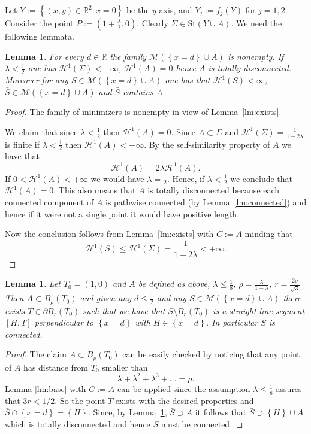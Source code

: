 \documentclass{amsart}
\newcommand{\RR}{\mathbb R}
\renewcommand{\H}{\mathcal H}
\newcommand{\ENCLOSE}[1]{\left\{#1\right\}}
\newcommand{\St}{\mathrm{St}}
\newcommand{\M}{\mathcal{M}}
\renewcommand{\H}{\mathcal{H}}
\newtheorem{lemma}[theorem]{Lemma}
\theoremstyle{definition}
\theoremstyle{remark}
\begin{document}
Let $Y:=\ENCLOSE{(x,y)\in\RR^2\colon x=0}$ be the $y$-axis,
and $Y_j := f_j(Y)$ for $j=1,2$.
Consider the point $P:=(1+\frac\lambda 2,0)$.
Clearly $\Sigma\in \St(Y\cup A)$.
We need the following lemmata.

\begin{lemma}\label{lm:existsA} 
  For every $d\in \RR$ the family $\M(\ENCLOSE{x=d}\cup A)$ is nonempty.
  If $\lambda < \frac 1 2$
  one has $\H^1(\Sigma)<+\infty$, $\H^1(A)=0$ hence $A$ is totally disconnected.
  Moreover for any $S \in \M(\ENCLOSE{x=d}\cup A)$ 
  one has that $\H^1(S)<\infty$,
  $\bar S\in \M(\ENCLOSE{x=d}\cup A)$ and
  $\bar S$ contains $A$.
\end{lemma}
%
\begin{proof}
  The family of minimizers is nonempty in view of Lemma~\ref{lm:exists}.

  We claim that since $\lambda < \frac 1 2$ then $\H^1(A)=0$. 
  Since $A\subset \Sigma$ and $\H^1(\Sigma)=\frac{1}{1-2\lambda}$
  is finite if $\lambda<\frac 1 2$ then $\H^1(A)<+\infty$.
  By the self-similarity property of $A$ we have that 
  \[
  \H^1(A) = 2 \lambda \H^1(A).
  \]
  If $0<\H^1(A)<+\infty$ we would have $\lambda = \frac 1 2$.
  Hence, if $\lambda < \frac 1 2$ we conclude that $\H^1(A)=0$.
  This also means that $A$ is totally disconnected because each connected 
  component of $A$ is pathwise connected (by Lemma~\ref{lm:connected}) 
  and hence if it were not a single point it would have positive length.
    
  Now the conclusion follows from Lemma~\ref{lm:exists} with $C:=A$ 
  minding that 
  \[
    \H^1(S)\le \H^1(\Sigma) = \frac{1}{1-2\lambda}<+\infty.
  \]
\end{proof}

\begin{lemma}\label{lm:01}
  Let $T_0=(1,0)$ and $A$ be defined as above,
  $\lambda \le \frac 1 8$,
  $\rho= \frac{\lambda}{1-\lambda}$,
  $r=\frac{2\rho}{\sqrt 3}$
  Then $A\subset B_\rho(T_0)$ and 
  given any $d\le \frac 1 2$ and any
  $S\in \M(\ENCLOSE{x=d}\cup A)$ 
  there exists $T\in \partial B_r(T_0)$ such that
  we have that $S\setminus B_r(T_0)$ is a straight line segment
  $[H,T]$ perpendicular to $\ENCLOSE{x=d}$ 
  with $H\in \ENCLOSE{x=d}$.
  In particular $\bar S$ is connected.
\end{lemma}
\begin{proof}
  The claim $A\subset B_\rho(T_0)$ can be easily checked
  by noticing that any point of $A$ has distance
  from $T_0$ smaller than 
  \[
      \lambda + \lambda^2 + \lambda^3 + \dots = \rho.
  \]
  Lemma \ref{lm:base} with $C:=A$ 
  can be applied since the assumption $\lambda \le \frac 1 8$ assures 
  that $3r < 1/2$.
  So the point $T$ exists with the desired properties and 
  $\bar S\cap \ENCLOSE{x=d} =\ENCLOSE{H}$.
  Since, by Lemma~\ref{lm:existsA}, $\bar S \supset A$
  it follows that $\bar S \supset \ENCLOSE{H}\cup A$ which is totally disconnected 
  and hence $\bar S$ must be connected.
\end{proof}
\end{document}
